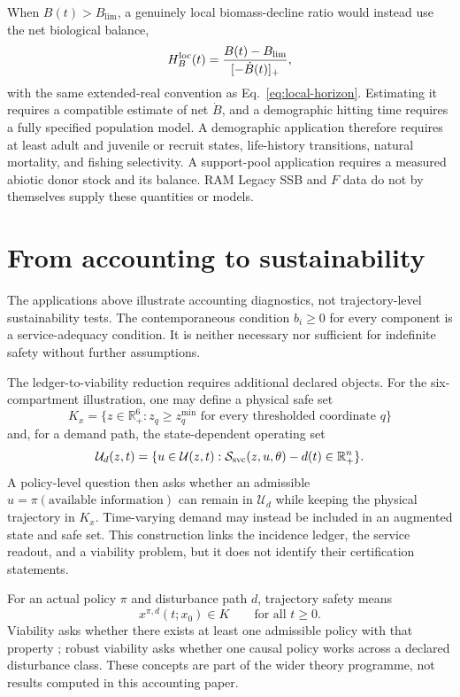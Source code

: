 \documentclass[11pt]{article}
\newcommand{\R}{\mathbb R}
\begin{document}
When $B(t)>B_{\lim}$, a genuinely local biomass-decline ratio would instead use the net biological balance,
\begin{equation}
H_B^{\rm loc}(t)
=\frac{B(t)-B_{\lim}}{[-\dot B(t)]_+},
\label{eq:biomass-local-ratio}
\end{equation}
with the same extended-real convention as Eq.~\eqref{eq:local-horizon}. Estimating it requires a compatible estimate of net $\dot B$, and a demographic hitting time requires a fully specified population model. A demographic application therefore requires at least adult and juvenile or recruit states, life-history transitions, natural mortality, and fishing selectivity. A support-pool application requires a measured abiotic donor stock and its balance. RAM Legacy SSB and $F$ data \cite{ricard2012} do not by themselves supply these quantities or models.

\section{From accounting to sustainability}

The applications above illustrate accounting diagnostics, not trajectory-level sustainability tests. The contemporaneous condition $b_i\ge0$ for every component is a service-adequacy condition. It is neither necessary nor sufficient for indefinite safety without further assumptions.

The ledger-to-viability reduction requires additional declared objects. For the six-compartment illustration, one may define a physical safe set
\[
K_x=\{z\in\R_+^6:z_q\ge z_q^{\min}\text{ for every thresholded coordinate }q\}
\]
and, for a demand path, the state-dependent operating set
\[
\mathcal U_d(z,t)
=\{u\in\mathcal U(z,t):\mathcal S_{\rm svc}(z,u,\theta)-d(t)\in\R_+^n\}.
\]
A policy-level question then asks whether an admissible $u=\pi(\text{available information})$ can remain in $\mathcal U_d$ while keeping the physical trajectory in $K_x$. Time-varying demand may instead be included in an augmented state and safe set. This construction links the incidence ledger, the service readout, and a viability problem, but it does not identify their certification statements.

For an actual policy $\pi$ and disturbance path $d$, trajectory safety means
\[
x^{\pi,d}(t;x_0)\in K\qquad\text{for all }t\ge0.
\]
Viability asks whether there exists at least one admissible policy with that property \cite{aubin1991,cury2005}; robust viability asks whether one causal policy works across a declared disturbance class. These concepts are part of the wider theory programme, not results computed in this accounting paper.
\end{document}

